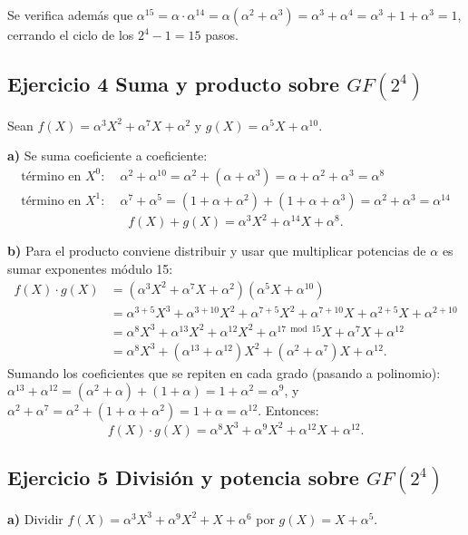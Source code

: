 \documentclass[11pt]{article}
\begin{document}
Se verifica además que $\alpha^{15}=\alpha\cdot\alpha^{14}=\alpha(\alpha^2+\alpha^3)=\alpha^3+\alpha^4=\alpha^3+1+\alpha^3=1$,
cerrando el ciclo de los $2^4-1=15$ pasos.

\subsection*{Ejercicio 4 Suma y producto sobre $GF(2^4)$}

Sean $f(X)=\alpha^3X^2+\alpha^7X+\alpha^2$ y $g(X)=\alpha^5X+\alpha^{10}$.

\textbf{a)} Se suma coeficiente a coeficiente:
\begin{align*}
\text{término en } X^0:&\; \alpha^2+\alpha^{10} = \alpha^2 + (\alpha+\alpha^3) = \alpha+\alpha^2+\alpha^3 = \alpha^8 \\
\text{término en } X^1:&\; \alpha^7+\alpha^5 = (1+\alpha+\alpha^2)+(1+\alpha+\alpha^3) = \alpha^2+\alpha^3 = \alpha^{14}
\end{align*}
$$f(X)+g(X) = \alpha^3X^2 + \alpha^{14}X + \alpha^8.$$

\textbf{b)} Para el producto conviene distribuir y usar que multiplicar potencias de
$\alpha$ es sumar exponentes módulo 15:
\begin{align*}
f(X)\cdot g(X) &= (\alpha^3X^2+\alpha^7X+\alpha^2)(\alpha^5X+\alpha^{10}) \\
&= \alpha^{3+5}X^3 + \alpha^{3+10}X^2 + \alpha^{7+5}X^2 + \alpha^{7+10}X + \alpha^{2+5}X + \alpha^{2+10} \\
&= \alpha^{8}X^3 + \alpha^{13}X^2 + \alpha^{12}X^2 + \alpha^{17\bmod 15}X + \alpha^{7}X + \alpha^{12} \\
&= \alpha^{8}X^3 + (\alpha^{13}+\alpha^{12})X^2 + (\alpha^{2}+\alpha^{7})X + \alpha^{12}.
\end{align*}
Sumando los coeficientes que se repiten en cada grado (pasando a polinomio):
$\alpha^{13}+\alpha^{12} = (\alpha^2+\alpha)+(1+\alpha) = 1+\alpha^2 = \alpha^9$, y
$\alpha^{2}+\alpha^{7} = \alpha^2+(1+\alpha+\alpha^2) = 1+\alpha = \alpha^{12}$. Entonces:
$$f(X)\cdot g(X) = \alpha^8X^3 + \alpha^9X^2 + \alpha^{12}X + \alpha^{12}.$$
\newpage
\subsection*{Ejercicio 5 División y potencia sobre $GF(2^4)$}

\textbf{a)} Dividir $f(X)=\alpha^3X^3+\alpha^9X^2+X+\alpha^6$ por $g(X)=X+\alpha^5$.
\end{document}
